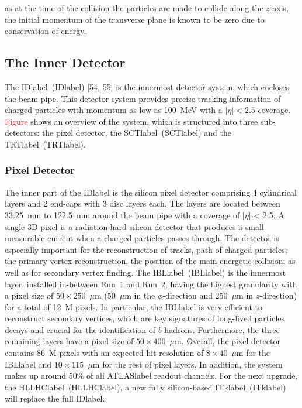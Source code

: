 as at the time of the collision the particles are made to collide along the $z$-axis, the initial momentum of the transverse plane is known to be zero due to conservation of energy.

\subsection{The Inner Detector}

The \acrlong{IDlabel}~(\acrshort{IDlabel}) [54, 55] is the innermost detector system, which encloses the beam pipe. This detector system provides precise tracking information of charged particles with momentum as low as 100~MeV with a $|\eta|<2.5$ coverage. \textcolor{red}{Figure} shows an overview of the system, which is structured into three sub-detectors: the pixel detector, the \acrlong{SCTlabel}~(\acrshort{SCTlabel}) and the \acrlong{TRTlabel}~(\acrshort{TRTlabel}).



\subsubsection*{Pixel Detector}

The inner part of the \acrshort{IDlabel} is the silicon pixel detector comprising 4 cylindrical layers and 2 end-caps with 3 disc layers each. The layers are located between 33.25~mm to 122.5~mm around the beam pipe with a coverage of $|\eta|$ < 2.5. A single 3D pixel is a radiation-hard silicon detector that produces a small measurable current when a charged particles passes through. The detector is especially important for the reconstruction of tracks, path of charged particles; the primary vertex reconstruction, the position of the main energetic collision; as well as for secondary vertex finding. The \acrlong{IBLlabel}~(\acrshort{IBLlabel}) is the innermost layer, installed in-between Run~1 and Run~2, having the highest granularity with a pixel size of $50\times 250$~$\mu$m (50~$\mu$m in the $\phi$-direction and 250~$\mu$m in $z$-direction) for a total of 12~M pixels. In particular, the \acrshort{IBLlabel} is very efficient to reconstruct secondary vertices, which are key signatures of long-lived particles decays and crucial for the identification of $b$-hadrons. Furthermore, the three remaining layers have a pixel size of $50\times 400$~$\mu$m. Overall, the pixel detector contains 86~M pixels with an expected hit resolution of $8\times 40$~$\mu$m for the \acrshort{IBLlabel} and $10\times 115$~$\mu$m for the rest of pixel layers. In addition, the system makes up around 50\% of all \acrshort{ATLASlabel} readout channels. For the next upgrade, the \acrlong{HLLHClabel}~(\acrshort{HLLHClabel}), a new fully silicon-based \acrlong{ITklabel}~(\acrshort{ITklabel}) will replace the full \acrshort{IDlabel}.

